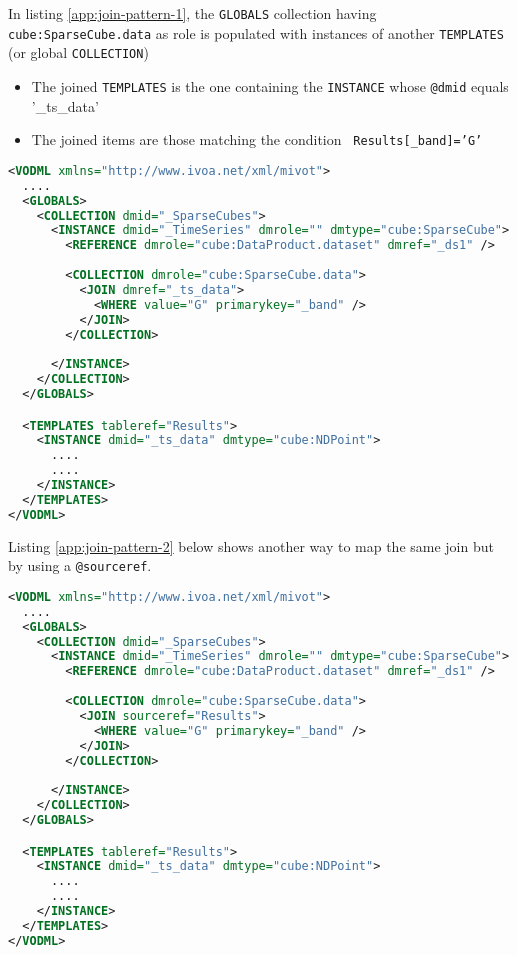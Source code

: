 
In listing \ref{app:join-pattern-1}, the \texttt{GLOBALS} collection having \texttt{cube:SparseCube.data} as role is populated with  instances of another \texttt{TEMPLATES} (or global \texttt{COLLECTION})
\begin{itemize}
  \item The joined \texttt{TEMPLATES} is the one containing the  \texttt{INSTANCE} whose \texttt{@dmid} equals '\_ts\_data'
  \item The joined items are those matching the condition  \texttt{ Results[\_band]='G'}
\end{itemize}

\begin{lstlisting}[label={app:join-pattern-1},caption={Joining a global \texttt{COLLECTION} with a \texttt{TEMPLATES}  identified by a  \texttt{(@dmid,@dmref)} pair.},language=XML]
<VODML xmlns="http://www.ivoa.net/xml/mivot">
  ....
  <GLOBALS>
    <COLLECTION dmid="_SparseCubes">
      <INSTANCE dmid="_TimeSeries" dmrole="" dmtype="cube:SparseCube">
        <REFERENCE dmrole="cube:DataProduct.dataset" dmref="_ds1" />
        
        <COLLECTION dmrole="cube:SparseCube.data">
          <JOIN dmref="_ts_data">
            <WHERE value="G" primarykey="_band" />
          </JOIN>
        </COLLECTION>
        
      </INSTANCE>
    </COLLECTION>
  </GLOBALS>

  <TEMPLATES tableref="Results">
    <INSTANCE dmid="_ts_data" dmtype="cube:NDPoint">
      ....
      ....
    </INSTANCE>
  </TEMPLATES>
</VODML>
\end{lstlisting}  

Listing \ref{app:join-pattern-2} below shows another way to map the same join but by using a \texttt{@sourceref}.

\begin{lstlisting}[label={app:join-pattern-2},caption={Joining a global \texttt{COLLECTION} with a \texttt{TEMPLATES}  identified by a \texttt{@sourceref}.},language=XML]
<VODML xmlns="http://www.ivoa.net/xml/mivot">
  ....
  <GLOBALS>
    <COLLECTION dmid="_SparseCubes">
      <INSTANCE dmid="_TimeSeries" dmrole="" dmtype="cube:SparseCube">
        <REFERENCE dmrole="cube:DataProduct.dataset" dmref="_ds1" />
        
        <COLLECTION dmrole="cube:SparseCube.data">
          <JOIN sourceref="Results">
            <WHERE value="G" primarykey="_band" />
          </JOIN>
        </COLLECTION>
        
      </INSTANCE>
    </COLLECTION>
  </GLOBALS>

  <TEMPLATES tableref="Results">
    <INSTANCE dmid="_ts_data" dmtype="cube:NDPoint">
      ....
      ....
    </INSTANCE>
  </TEMPLATES>
</VODML>
\end{lstlisting}  

